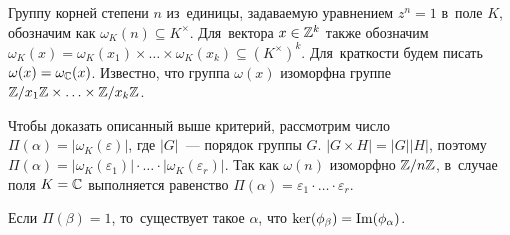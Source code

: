 \documentclass{article}
\begin{document}
Группу корней степени $n$ из~единицы, задаваемую уравнением $z^n = 1$ в~поле $K$, обозначим как $\omega_K(n) \subseteq K^\times$.
Для~вектора $x \in \mathbb{Z}^k$ также обозначим $\omega_K(x) = \omega_K(x_1) \times \ldots \times \omega_K(x_k) \subseteq (K^\times)^k$.
Для~краткости будем писать $\omega(x) = \omega_{\mathbb{C}}(x)$. Известно, что группа $\omega(x)$ изоморфна
группе $\mathbb{Z} / x_1 \mathbb{Z} \times \ldots \times \mathbb{Z} / x_k \mathbb{Z}$.

Чтобы доказать описанный выше критерий, рассмотрим число $\Pi(\alpha) = |\omega_K(\varepsilon)|$, где $|G|$~— порядок группы $G$.
$|G \times H| = |G| |H|$, поэтому $\Pi(\alpha) = |\omega_K(\varepsilon_1)| \cdot \ldots \cdot |\omega_K(\varepsilon_r)|$.
Так как $\omega(n)$ изоморфно $\mathbb{Z} / n \mathbb{Z}$, в~случае поля $K = \mathbb{C}$ выполняется
равенство $\Pi(\alpha) = \varepsilon_1 \cdot \ldots \cdot \varepsilon_r$.

\begin{lemma}
\label{lemma:exactOutOfPi}
    Если $\Pi(\beta) = 1$, то~существует такое $\alpha$, что $\ker(\phi_\beta) = \mathrm{Im}(\phi_\alpha)$.
\end{lemma}
\end{document}
